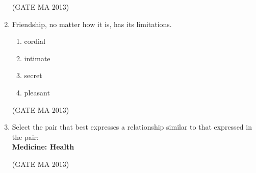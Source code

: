 \documentclass[journal,12pt,onecolumn]{IEEEtran}
\theoremstyle{remark}
\begin{document}
\begin{enumerate}
    \hfill (GATE MA 2013)
    \item Friendship, no matter how \underline{\hspace{1cm}} it is, has its limitations.
    \begin{enumerate}
        \item cordial
        \item intimate
        \item secret
        \item pleasant
    \end{enumerate}
    \hfill (GATE MA 2013)
    \item Select the pair that best expresses a relationship similar to that expressed in the pair: \\
    \textbf{Medicine: Health}
    \begin{enumerate}
    \end{enumerate}
    \hfill (GATE MA 2013)
\end{enumerate}
\end{document}

